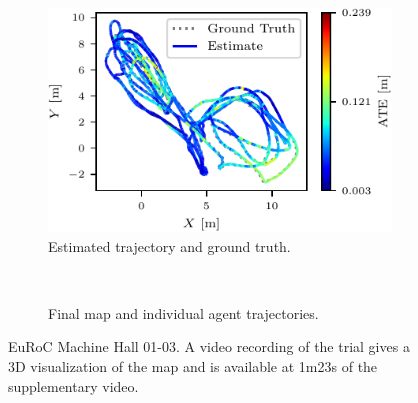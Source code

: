 \begin{figure}[h]
    \centering
    \captionsetup{format=plain}
    \begin{subfigure}[t]{0.5\linewidth}
        \centering
        \includegraphics[width=\linewidth]{figures/apr11_mh_trajectory_b_trajectory.pdf}
        \caption{Estimated trajectory and ground truth.}
    \end{subfigure}\hfill%
    ~
    \begin{subfigure}[t]{0.45\linewidth}
        \centering
        \caption{Final map and individual agent trajectories.}
    \end{subfigure}

    \caption{EuRoC Machine Hall 01-03. A video recording of the trial gives a 3D visualization of the map and is available at 1m23s  of the supplementary video\protect\footnotemark[1]. }
    \label{fig:euroc-traj}

\end{figure}

